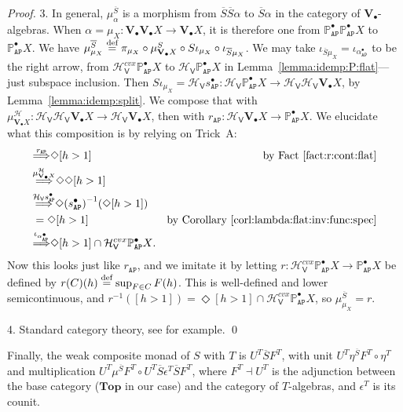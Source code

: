 \documentclass[preprint,12pt]{elsarticle}
\newcommand\eqdef{\mathrel{\buildrel \text{def}\over=}}
\newcommand\Pred{\mathbb{P}}
\newcommand\Angel{{\mathtt{A}}}
\newcommand\Nature{{\mathtt{P}}}
\newcommand\AN{{\Angel\Nature}}
\newcommand\invto[1]{{\buildrel {#1} \over\Longrightarrow}}
\newcommand\Hoare{{\mathcal H}}
\newcommand\Vt{\mathsf{V}}
\newcommand\HV{\Hoare_\Vt}
\newcommand\Val{{\mathbf V}}
\newcommand\Topcat{\mathbf{Top}}
\begin{document}
\begin{proof}
  3. In general, $\mu^{\overline S}_\alpha$ is a morphism from
  $\overline S {\overline S \alpha}$ to $\overline S \alpha$ in the
  category of $\Val_\bullet$-algebras.  When
  $\alpha = \mu_X \colon \Val_\bullet {\Val_\bullet X} \to
  \Val_\bullet X$, it is therefore one from
  $\Pred_\AN^\bullet {\Pred_\AN^\bullet X}$ to $\Pred_\AN^\bullet X$.
  We have
  $\mu^{\overline S}_{\mu_X} \eqdef \pi_{\mu_X} \circ
  \mu^S_{\Val_\bullet X} \circ S \iota_{\mu_X} \circ \iota_{\overline
    S \mu_X}$.  We may take
  $\iota_{\overline S \mu_X} = \iota_{\alpha_\AN^\bullet}$ to be the
  right arrow, from $\HV^{cvx} {\Pred_\AN^\bullet X}$ to
  $\HV {\Pred_\AN^\bullet X}$ in Lemma~\ref{lemma:idemp:P:flat}---just
  subspace inclusion.  Then
  $S \iota_{\mu_X} = \HV {s_\AN^\bullet} \colon \HV {\Pred_\AN^\bullet
    X} \to \HV {\HV {\Val_\bullet X}}$, by
  Lemma~\ref{lemma:idemp:split}.  We compose that with
  $\mu^\Hoare_{\Val_\bullet X} \colon \HV {\HV {\Val_\bullet X}} \to
  \HV {\Val_\bullet X}$, then with
  $r_\AN \colon \HV {\Val_\bullet X} \to \Pred_\AN^\bullet X$.  We
  elucidate what this composition is by relying on Trick~A:
  \begin{align*}
    [h > 1]
    & \invto{r_\AN}
      \Diamond {[h > 1]}
    & \text{by Fact~\ref{fact:r:cont:flat}} \\
    & \invto{\mu^\Hoare_{\Val_\bullet X}}
      \Diamond {\Diamond {[h > 1]}} \\
    & \invto{\HV {s_\AN^\bullet}}
      \Diamond {{(s_\AN^\bullet)}^{-1} (\Diamond {[h > 1]})} \\
    & = \Diamond {[h > 1]}
    & \text{by Corollary~\ref{corl:lambda:flat:inv:func:spec}} \\
    & \invto{\iota_{\alpha_\AN^\bullet}}
      \Diamond {[h > 1]} \cap \HV^{cvx} {\Pred_\AN^\bullet X}.
  \end{align*}
  Now this looks just like $r_\AN$, and we imitate it by letting
  $r \colon \HV^{cvx} {\Pred_\AN^\bullet X} \to \Pred_\AN^\bullet X$
  be defined by $r (C) (h) \eqdef \sup_{F \in C} F (h)$.  This is
  well-defined and lower semicontinuous, and
  $r^{-1} ([h > 1]) = \Diamond {[h > 1]} \cap \HV^{cvx} {\Pred_\AN^\bullet
    X}$, so $\mu^{\overline S}_{\mu_X} = r$.

  4. Standard category theory, see \cite[Chapter~VI, Section~2,
  Theorem~1]{McLane:cat:math} for example.  \qed
\end{proof}

Finally, the weak composite monad of $S$ with $T$ is
$U^T \overline S F^T$, with unit
$U^T \eta^{\overline S} F^T \circ \eta^T$ and multiplication
$U^T \mu^{\overline S} F^T \circ U^T \overline S \epsilon^T \overline
S F^T$, where $F^T \dashv U^T$ is the adjunction between the base
category ($\Topcat$ in our case) and the category of $T$-algebras, and
$\epsilon^T$ is its counit.
\end{document}
